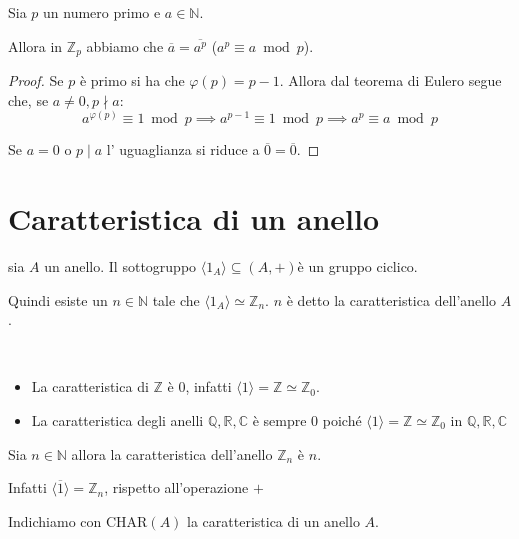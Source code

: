 \documentclass[../main.tex]{subfiles}
\begin{document}
\begin{corollary}
    Sia $p$ un numero primo e $a \in \mathbb{N}$.

    Allora in $\mathbb{Z}_p$ abbiamo che $\overline{a} = \overline{a^p}$ ($a^p \equiv a \bmod p$).
\end{corollary}
\begin{proof}
    Se $p$ è primo si ha che $\varphi(p) = p-1$. Allora dal teorema di Eulero segue che, se $a \neq 0, p \nmid a$:
    \[
        a^{\varphi(p)} \equiv 1 \bmod p \implies a^{p-1} \equiv 1 \bmod p \implies a^p \equiv a \bmod p
    \]

    Se $a = 0$ o $p \mid a$ l' uguaglianza si riduce a $\overline{0} = \overline{0}$.
\end{proof}

\section{Caratteristica di un anello}
\begin{definition}
    sia $A$ un anello. Il sottogruppo $\langle1_A\rangle \subseteq (A,+)$è un gruppo ciclico.

    Quindi esiste un $n \in \mathbb{N}$ tale che $\langle1_A\rangle \simeq \mathbb{Z}_n$. $n$ è detto la caratteristica dell'anello $A$.
\end{definition}
\begin{example}\
    \begin{itemize}
        \item La caratteristica di $\mathbb{Z}$ è $0$, infatti $\langle1\rangle = \mathbb{Z} \simeq \mathbb{Z}_0$.

        \item La caratteristica degli anelli $\mathbb{Q},\mathbb{R},\mathbb{C}$ è sempre 0 poiché $\langle1\rangle = \mathbb{Z} \simeq \mathbb{Z}_0$ in $\mathbb{Q},\mathbb{R},\mathbb{C}$
    \end{itemize}
\end{example}

\begin{example}
    Sia $n \in \mathbb{N}$ allora la caratteristica dell'anello $\mathbb{Z}_n$ è $n$.

    Infatti $\langle\overline{1}\rangle = \mathbb{Z}_n$, rispetto all'operazione $+$
\end{example}

Indichiamo con $\text{CHAR}(A)$ la caratteristica di un anello $A$.
\end{document}
